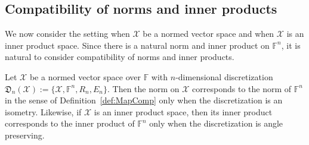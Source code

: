 \documentclass[a4paper]{paper}
\newcommand{\discr}{\mathfrak{D}}
\newcommand{\VecSpace}[1]{\mathscr{#1}}
\newcommand{\Field}{\mathbb{F}}
\begin{document}
\subsection{Compatibility of norms and inner products}
We now consider the setting when $\VecSpace{X}$ be a normed vector space and when 
$\VecSpace{X}$ is an inner product space. Since there is a natural norm and inner product on
$\Field^{n}$, it is natural to consider compatibility of norms and inner products. 
\begin{theorem}\label{ThmNormInnerProd}
  Let $\VecSpace{X}$ be a normed vector space over $\Field$ with $n$-dimensional
  discretization $\discr_{n}(\VecSpace{X}):=\{\VecSpace{X},\Field^{n},R_{n},E_{n}\}$. 
  Then the norm on $\VecSpace{X}$ corresponds to the norm of $\Field^{n}$ 
  in the sense of Definition~\ref{def:MapComp} only when the discretization is an isometry. 
  Likewise, if $\VecSpace{X}$ is an inner product space, then its inner product corresponds to the 
  inner product of $\Field^{n}$ only when the discretization is angle preserving.
\end{theorem}
\end{document}
